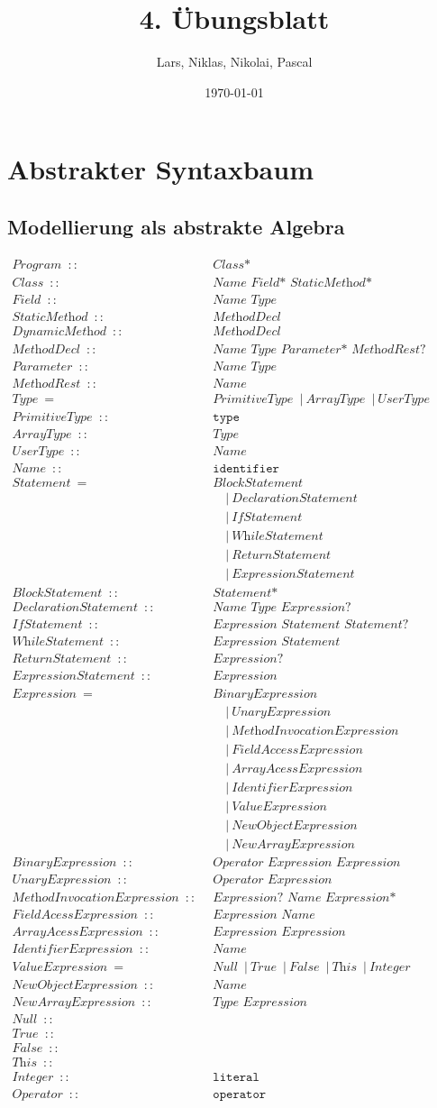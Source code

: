 \documentclass[12pt,a4paper]{scrartcl}
\title{4. Übungsblatt}
\author{Lars, Niklas, Nikolai, Pascal}
\date{\today}
\newcommand{\node}[2]{\textit{#1} \enspace::\enspace &\textit{#2}\\}
\newcommand{\leaf}[2]{\textit{#1} \enspace::\enspace &\texttt{#2}\\}
\newcommand{\kind}[2]{\textit{#1} \enspace=\enspace &\textit{#2}\\}
\renewcommand{\bar}[1]{&\quad | \:\textit{#1}\\}
\newcommand{\kindol}[2]{\textit{#1} \enspace=\enspace &\textit{#2}}
\newcommand{\barol}[1]{\enspace | \:\textit{#1}}
\begin{document}
\allowdisplaybreaks

\maketitle

\section{Abstrakter Syntaxbaum}

\subsection{Modellierung als abstrakte Algebra}

\begin{align*}
    \node{Program}{Class*}
    \node{Class}{Name Field* StaticMethod* DynamicMethod*}
    \node{Field}{Name Type}
    \node{StaticMethod}{MethodDecl}
    \node{DynamicMethod}{MethodDecl}
    \node{MethodDecl}{Name Type Parameter* MethodRest? Statement+}
    \node{Parameter}{Name Type}
    \node{MethodRest}{Name}
    \kindol{Type}{PrimitiveType}
        \barol{ArrayType}
        \barol{UserType}\\
    \leaf{PrimitiveType}{type}
    \node{ArrayType}{Type}
    \node{UserType}{Name}
    \leaf{Name}{identifier}
    \kind{Statement}{BlockStatement}
        \bar{DeclarationStatement}
        \bar{IfStatement}
        \bar{WhileStatement}
        \bar{ReturnStatement}
        \bar{ExpressionStatement}
    \node{BlockStatement}{Statement*}
    \node{DeclarationStatement}{Name Type Expression?}
    \node{IfStatement}{Expression Statement Statement?}
    \node{WhileStatement}{Expression Statement}
    \node{ReturnStatement}{Expression?}
    \node{ExpressionStatement}{Expression}
    \kind{Expression}{BinaryExpression}
        \bar{UnaryExpression}
        \bar{MethodInvocationExpression}
        \bar{FieldAccessExpression}
        \bar{ArrayAcessExpression}
        \bar{IdentifierExpression}
        \bar{ValueExpression}
        \bar{NewObjectExpression}
        \bar{NewArrayExpression}
    \node{BinaryExpression}{Operator Expression Expression}
    \node{UnaryExpression}{Operator Expression}
    \node{MethodInvocationExpression}{Expression? Name Expression*}
    \node{FieldAcessExpression}{Expression Name}
    \node{ArrayAcessExpression}{Expression Expression}
    \node{IdentifierExpression}{Name}
    \kindol{ValueExpression}{Null}
        \barol{True}
        \barol{False}
        \barol{This}
        \barol{Integer}\\
    \node{NewObjectExpression}{Name}
    \node{NewArrayExpression}{Type Expression}
    \leaf{Null}{}
    \leaf{True}{}
    \leaf{False}{}
    \leaf{This}{}
    \leaf{Integer}{literal}
    \leaf{Operator}{operator}
\end{align*}
\end{document}
